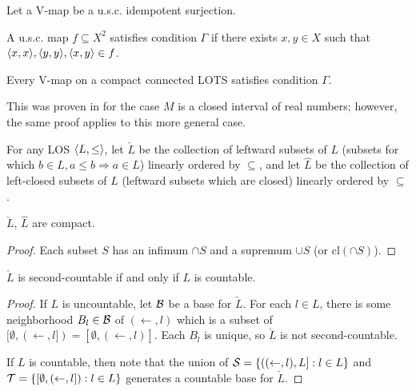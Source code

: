 \documentclass[11pt]{article}
\renewcommand{\cl}{\textrm{cl}}
\begin{document}
  \begin{definition}
    Let a V-map be a u.s.c. idempotent surjection.
  \end{definition}

  \begin{definition}
    A u.s.c. map \(f\subseteq X^2\)
    satisfies condition \(\Gamma\) if there exists \(x,y\in X\) such that
    \(\langle x,x\rangle,\langle y,y\rangle,\langle x,y\rangle\in f\).
  \end{definition}

  \begin{theorem}
    Every V-map on a compact connected LOTS satisfies condition \(\Gamma\).
  \end{theorem}

  This was proven in \cite{CLONTZVARAGONA} for the case \(M\) is a closed
  interval of real numbers; however, the same proof applies to this more
  general case.





\newpage

  \begin{definition}
    For any LOS \(\langle L,\leq\rangle\), let \(\check L\) be the collection of
    leftward subsets of \(L\)
    (subsets for which \(b\in L,a\leq b\Rightarrow a\in L\))
    linearly ordered by \(\subseteq\), and let \(\hat L\) be the collection
    of left-closed subsets of \(L\) (leftward subsets which are closed)
    linearly ordered by \(\subseteq\).
  \end{definition}

  \begin{proposition}
    \(\check L\), \(\hat L\) are compact.
  \end{proposition}

  \begin{proof}
    Each subset \(S\) has an infimum \(\cap S\) and a supremum \(\cup S\)
    (or \(\cl(\cap S)\)).
  \end{proof}

  \begin{theorem}
    \(\check L\) is second-countable if and only if \(L\) is countable.
  \end{theorem}

  \begin{proof}
    If \(L\) is uncountable, let \(\mathcal{B}\) be a base for \(\check L\).
    For each \(l\in L\), there is some neighborhood \(B_l\in\mathcal{B}\) of
    \((\leftarrow,l)\) which is a subset of
    \([\emptyset,(\leftarrow,l])=[\emptyset,(\leftarrow,l)]\). Each \(B_l\)
    is unique, so \(\check L\) is not second-countable.

    If \(L\) is countable, then note that the union of
    \(\mathcal{S}=\{((\leftarrow,l),L]:l\in L\}\) and
    \(\mathcal{T}=\{[\emptyset,(\leftarrow,l]):l\in L\}\)
    generates a countable base for \(\check L\).
  \end{proof}
\end{document}
